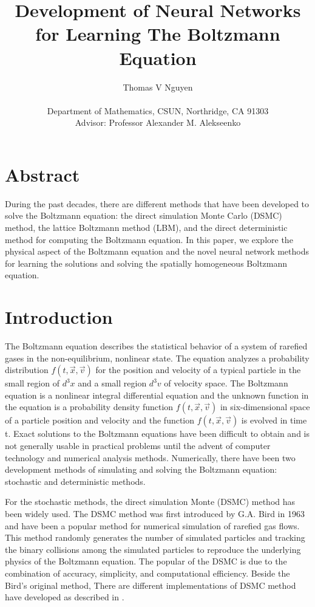 \documentclass{article}
\title{Development of Neural Networks for Learning The Boltzmann Equation	 }
\author{Thomas V Nguyen \\ \\ Department of Mathematics, CSUN, Northridge, CA 91303 \\
	Advisor: Professor Alexander M. Alekseenko
}
\date{}
\begin{document}
\begin{titlepage}
	\maketitle
\end{titlepage}

\section*{Abstract} During the past decades, there are different methods that have been developed to solve the Boltzmann equation: the direct simulation Monte Carlo (DSMC) method, the lattice Boltzmann method (LBM), and the direct deterministic method for computing the Boltzmann equation. In this paper, we explore the physical aspect of the Boltzmann equation and the novel neural network methods for learning the solutions and solving the spatially homogeneous Boltzmann equation.
\section{Introduction} \label{Intro}
The Boltzmann equation describes the statistical behavior of a system of rarefied gases in the non-equilibrium, nonlinear state. The equation analyzes a probability distribution $f(t,\vec{x}, \vec{v})$ for the position and velocity of a typical particle in the small region of $d^3x$ and a small region $d^3v$ of velocity space. The Boltzmann equation is a nonlinear integral differential equation and the unknown function in the equation is a probability density function $f(t,\vec{x}, \vec{v})$ in six-dimensional space of a particle position and velocity and the function $f(t,\vec{x}, \vec{v})$ is evolved in time t. Exact solutions to the Boltzmann equations have been difficult to obtain and is not generally usable in practical problems until the advent of computer technology and numerical analysis methods. Numerically, there have been two development methods of simulating and solving the Boltzmann equation: stochastic and deterministic methods. 

For the stochastic methods, the direct simulation Monte (DSMC) method has been widely used. The DSMC method was first introduced by G.A. Bird in 1963 \cite{BirdGA1} and have been a popular method for numerical simulation of rarefied gas flows. This method randomly generates the number of simulated particles and tracking the binary collisions among the simulated particles to reproduce the underlying physics of the Boltzmann equation. The popular of the DSMC is due to the combination of accuracy, simplicity, and computational efficiency. Beside the Bird’s original method, There are different implementations of DSMC method have developed as described in \cite{DSMC1, DSMC2, DSMC3}. 
\end{document}
